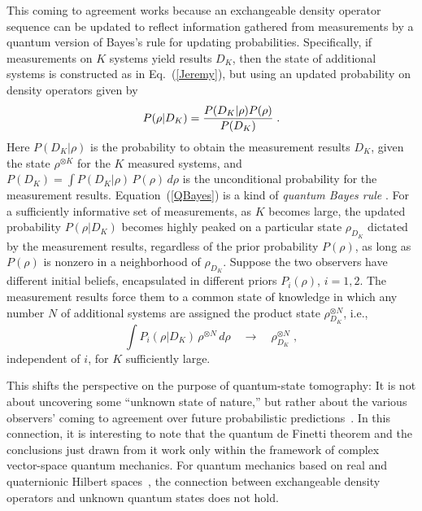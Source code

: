 This coming to agreement works because an exchangeable density
operator sequence can be updated to reflect information gathered
from measurements by a quantum version of Bayes's rule for
updating probabilities. Specifically, if measurements on $K$
systems yield results $D_K$, then the state of additional systems
is constructed as in Eq.~(\ref{Jeremy}), but using an updated
probability on density operators given by
\begin{equation}
P(\rho|D_K)={P(D_K|\rho)P(\rho)\over P(D_K)}\;.
\label{QBayes}
\end{equation}
Here $P(D_K|\rho)$ is the probability to obtain the measurement
results $D_K$, given the state $\rho^{\otimes K}$ for the $K$
measured systems, and $P(D_K)=\int P(D_K|\rho)\,P(\rho)\,d\rho$ is
the unconditional probability for the measurement results.
Equation~(\ref{QBayes}) is a kind of {\it quantum Bayes rule}
\cite{Schack2000}.  For a sufficiently informative set of
measurements, as $K$ becomes large, the updated probability
$P(\rho|D_K)$ becomes highly peaked on a particular state
$\rho_{D_K}$ dictated by the measurement results, regardless of the
prior probability $P(\rho)$, as long as $P(\rho)$ is nonzero in a
neighborhood of $\rho_{D_K}$.  Suppose the two observers have
different initial beliefs, encapsulated in different priors
$P_i(\rho)$, $i=1,2$.  The measurement results force them to a
common state of knowledge in which any number $N$ of additional
systems are assigned the product state $\rho_{D_K}^{\otimes N}$,
i.e.,
\begin{equation}
\int P_i(\rho|D_K)\,\rho^{\otimes N}\,d\rho
\quad{\longrightarrow}\quad
\rho_{D_K}^{\otimes N}\;,
\label{HannibalLecter}
\end{equation}
independent of $i$, for $K$ sufficiently large.

This shifts the perspective on the purpose of quantum-state
tomography:  It is not about uncovering some ``unknown state of
nature,'' but rather about the various observers' coming to
agreement over future probabilistic predictions~\cite{Fuchs2000b}.
In this connection, it is interesting to note that the quantum de
Finetti theorem and the conclusions just drawn from it work only
within the framework of complex vector-space quantum mechanics.
For quantum mechanics based on real and quaternionic Hilbert
spaces~\cite{Stueckelberg1960,Adler1995}, the connection between
exchangeable density operators and unknown quantum states does
not hold.

